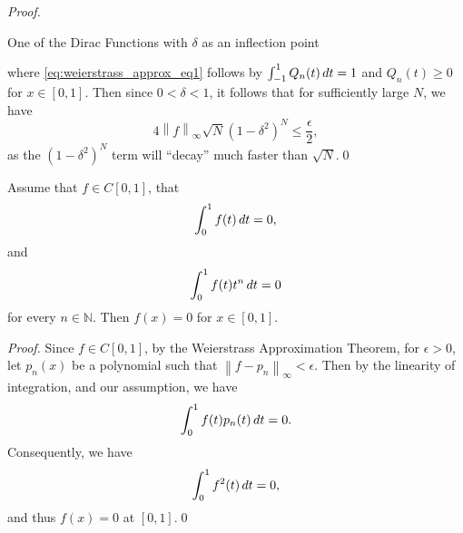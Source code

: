 \documentclass[notoc,notitlepage]{tufte-book}
\newcommand{\norm}[1]{\left\| #1 \right\|}
\begin{document}
\begin{proof}
\begin{marginfigure}
    \caption{One of the Dirac Functions with $\delta$ as an inflection point}\label{fig:one_of_the_dirac_functions_with_delta_as_an_inflection_point}
  \end{marginfigure}
  where \cref{eq:weierstrass_approx_eq1} follows by $\int_{-1}^{1} Q_n(t) \mathop{}\!d{t} = 1$ and $Q_n(t) \geq 0$ for $x \in [0, 1]$. Then since $0 < \delta < 1$, it follows that for sufficiently large $N$, we have
  \begin{equation*}
    4 \norm{f}_\infty \sqrt{N} \left( 1 - \delta^2 \right)^N \leq \frac{\epsilon}{2},
  \end{equation*}
  as the $\left( 1 - \delta^2 \right)^N$ term will ``decay'' much faster than $\sqrt{N}$.\qed\
\end{proof}

\begin{propo}[Moments]\label{propo:moments}
  Assume that $f \in C[0, 1]$, that
  \begin{equation*}
    \int_{0}^{1} f(t) \mathop{}\!d{t} = 0,
  \end{equation*}
  and
  \begin{equation*}
    \int_{0}^{1} f(t) t^n \mathop{}\!d{t} = 0
  \end{equation*}
  for every $n \in \mathbb{N}$. Then $f(x) = 0$ for $x \in [0, 1]$.
\end{propo}
\begin{proof}
  Since $f \in C[0, 1]$, by the Weierstrass Approximation Theorem, for $\epsilon > 0$, let $p_n(x)$ be a polynomial such that $\norm{ f - p_n }_\infty < \epsilon$. Then by the linearity of integration, and our assumption, we have
  \begin{equation*}
    \int_{0}^{1} f(t) p_n(t) \mathop{}\!d{t} = 0.
  \end{equation*}
  Consequently, we have
  \begin{equation*}
    \int_{0}^{1} f^2(t) \mathop{}\!d{t} = 0,
  \end{equation*}
  and thus $f(x) = 0$ at $[0, 1]$.\qed\
\end{proof}
\end{document}
